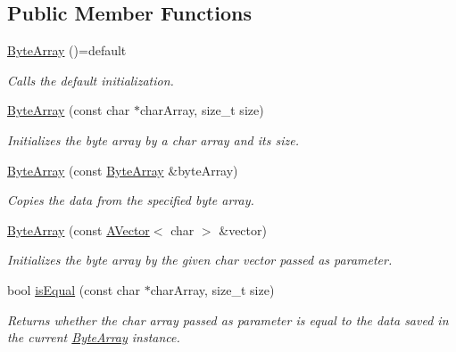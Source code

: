 \subsection*{Public Member Functions}
\begin{DoxyCompactItemize}
\item 
\mbox{\label{class_byte_array_a7976b9304340be61157d5f6401cbd506}} 
\mbox{\hyperlink{class_byte_array_a7976b9304340be61157d5f6401cbd506}{Byte\+Array}} ()=default
\begin{DoxyCompactList}\small\item\em Calls the default initialization. \end{DoxyCompactList}\item 
\mbox{\hyperlink{class_byte_array_a5370ae20f7491913d891a624ea77ad52}{Byte\+Array}} (const char $\ast$char\+Array, size\+\_\+t size)
\begin{DoxyCompactList}\small\item\em Initializes the byte array by a char array and its size. \end{DoxyCompactList}\item 
\mbox{\hyperlink{class_byte_array_a6d8888512392eb9e671f56e434179fa1}{Byte\+Array}} (const \mbox{\hyperlink{class_byte_array}{Byte\+Array}} \&byte\+Array)
\begin{DoxyCompactList}\small\item\em Copies the data from the specified byte array. \end{DoxyCompactList}\item 
\mbox{\hyperlink{class_byte_array_a94a65f2b5c6952713712e23a574b0295}{Byte\+Array}} (const \mbox{\hyperlink{class_a_vector}{A\+Vector}}$<$ char $>$ \&vector)
\begin{DoxyCompactList}\small\item\em Initializes the byte array by the given char vector passed as parameter. \end{DoxyCompactList}\item 
bool \mbox{\hyperlink{class_byte_array_a4c0af1c1fe9ee1e6fa1e8ce7b0bde83a}{is\+Equal}} (const char $\ast$char\+Array, size\+\_\+t size)
\begin{DoxyCompactList}\small\item\em Returns whether the char array passed as parameter is equal to the data saved in the current \mbox{\hyperlink{class_byte_array}{Byte\+Array}} instance. \end{DoxyCompactList}\item 

\end{DoxyCompactItemize}
